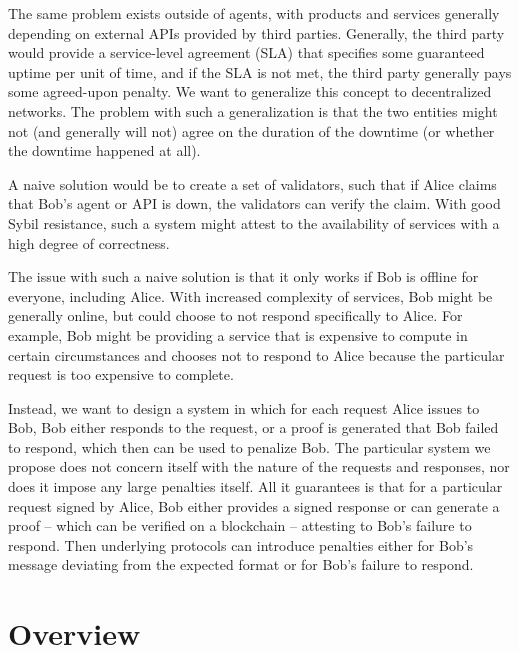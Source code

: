 \documentclass{article}
\begin{document}
The same problem exists outside of agents, with products and services generally depending on external APIs provided by third parties. Generally, the third party would provide a service-level agreement (SLA) that specifies some guaranteed uptime per unit of time, and if the SLA is not met, the third party generally pays some agreed-upon penalty. We want to generalize this concept to decentralized networks. The problem with such a generalization is that the two entities might not (and generally will not) agree on the duration of the downtime (or whether the downtime happened at all).

A naive solution would be to create a set of validators, such that if Alice claims that Bob's agent or API is down, the validators can verify the claim. With good Sybil resistance, such a system might attest to the availability of services with a high degree of correctness.

The issue with such a naive solution is that it only works if Bob is offline for everyone, including Alice. With increased complexity of services, Bob might be generally online, but could choose to not respond specifically to Alice. For example, Bob might be providing a service that is expensive to compute in certain circumstances and chooses not to respond to Alice because the particular request is too expensive to complete.

Instead, we want to design a system in which for each request Alice issues to Bob, Bob either responds to the request, or a proof is generated that Bob failed to respond, which then can be used to penalize Bob. The particular system we propose does not concern itself with the nature of the requests and responses, nor does it impose any large penalties itself. All it guarantees is that for a particular request signed by Alice, Bob either provides a signed response or can generate a proof – which can be verified on a blockchain – attesting to Bob's failure to respond. Then underlying protocols can introduce penalties either for Bob's message deviating from the expected format or for Bob's failure to respond.


\section{Overview}
\end{document}
